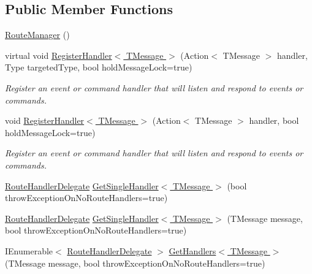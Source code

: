 \subsection*{Public Member Functions}
\begin{DoxyCompactItemize}
\item 
\hyperlink{classCqrs_1_1Bus_1_1RouteManager_abcc8a62319ac7a6edd38ed2d26ef5234_abcc8a62319ac7a6edd38ed2d26ef5234}{Route\+Manager} ()
\item 
virtual void \hyperlink{classCqrs_1_1Bus_1_1RouteManager_a5a01e8a6c9ae6311bca2d9e5cb75a7b9_a5a01e8a6c9ae6311bca2d9e5cb75a7b9}{Register\+Handler$<$ T\+Message $>$} (Action$<$ T\+Message $>$ handler, Type targeted\+Type, bool hold\+Message\+Lock=true)
\begin{DoxyCompactList}\small\item\em Register an event or command handler that will listen and respond to events or commands. \end{DoxyCompactList}\item 
void \hyperlink{classCqrs_1_1Bus_1_1RouteManager_aeb620222dd0351a6d3848caf93e29954_aeb620222dd0351a6d3848caf93e29954}{Register\+Handler$<$ T\+Message $>$} (Action$<$ T\+Message $>$ handler, bool hold\+Message\+Lock=true)
\begin{DoxyCompactList}\small\item\em Register an event or command handler that will listen and respond to events or commands. \end{DoxyCompactList}\item 
\hyperlink{classCqrs_1_1Bus_1_1RouteHandlerDelegate}{Route\+Handler\+Delegate} \hyperlink{classCqrs_1_1Bus_1_1RouteManager_a1fafb5abc81384949c51b1d8887a7921_a1fafb5abc81384949c51b1d8887a7921}{Get\+Single\+Handler$<$ T\+Message $>$} (bool throw\+Exception\+On\+No\+Route\+Handlers=true)
\item 
\hyperlink{classCqrs_1_1Bus_1_1RouteHandlerDelegate}{Route\+Handler\+Delegate} \hyperlink{classCqrs_1_1Bus_1_1RouteManager_aa681cc48828440452f6984f198369e69_aa681cc48828440452f6984f198369e69}{Get\+Single\+Handler$<$ T\+Message $>$} (T\+Message message, bool throw\+Exception\+On\+No\+Route\+Handlers=true)
\item 
I\+Enumerable$<$ \hyperlink{classCqrs_1_1Bus_1_1RouteHandlerDelegate}{Route\+Handler\+Delegate} $>$ \hyperlink{classCqrs_1_1Bus_1_1RouteManager_a738be20bb4ad702f7689e2aad70a9dc5_a738be20bb4ad702f7689e2aad70a9dc5}{Get\+Handlers$<$ T\+Message $>$} (T\+Message message, bool throw\+Exception\+On\+No\+Route\+Handlers=true)
\end{DoxyCompactItemize}
